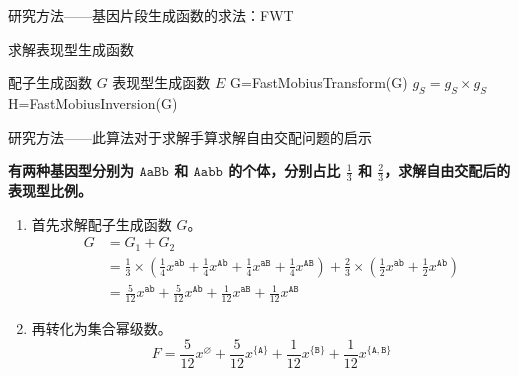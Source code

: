\documentclass[10pt,aspectratio=43,mathserif]{ctexbeamer}
\begin{document}
	\begin{frame}{研究方法——基因片段生成函数的求法：FWT}
		\begin{algorithm}[H]
			\caption{求解表现型生成函数}
			\begin{algorithmic}[1]
				\Require 配子生成函数 $G$
				\Ensure 表现型生成函数 $E$
				\State G=FastMobiusTransform(G)
				\State $g_S=g_S \times g_S$
				\EndFor
				\State H=FastMobiusInversion(G)
				\State {}
				\EndFunction
			\end{algorithmic}
		\end{algorithm}
	\end{frame}

	\begin{frame}{研究方法——此算法对于求解手算求解自由交配问题的启示}
	
		\textbf{有两种基因型分别为 $\texttt{AaBb}$ 和 $\texttt{Aabb}$ 的个体，分别占比 $\frac{1}{3}$ 和 $\frac{2}{3}$，求解自由交配后的表现型比例。}
		
		\begin{enumerate}
			\item 首先求解配子生成函数 $G$。\\ 
			$$
			\begin{aligned}
				G &= G_1+G_2 \\
				&= \frac{1}{3} \times (\frac{1}{4}x^{\texttt{ab}}+\frac{1}{4}x^{\texttt{Ab}}+\frac{1}{4}x^{\texttt{aB}}+\frac{1}{4}x^{\texttt{AB}})+\frac{2}{3} \times (\frac{1}{2}x^{\texttt{ab}} + \frac{1}{2}x^{\texttt{Ab}}) \\
				&= \frac{5}{12} x^{\texttt{ab}} + \frac{5}{12} x^{\texttt{Ab}} + \frac{1}{12} x^{\texttt{aB}} + \frac{1}{12} x^{\texttt{AB}}
			\end{aligned}
			$$
			\item 再转化为集合幂级数。\\
			$$F = \frac{5}{12} x^{\varnothing} + \frac{5}{12} x^{\{\texttt{A}\}} + \frac{1}{12} x^{\{\texttt{B}\}} + \frac{1}{12} x^{\{\texttt{A},\texttt{B}\}}
			$$
		\end{enumerate}
	\end{frame}
\end{document}
